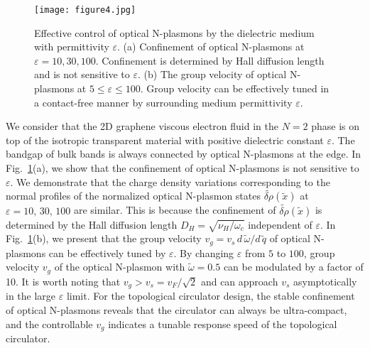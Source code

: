 \documentclass[%
reprint,
amsmath,amssymb,
aps,superscriptaddress
]{revtex4-2}
\begin{document}
\begin{figure}[t]
    \centering
    \texttt{[image: figure4.jpg]}
    \caption{Effective control of optical N-plasmons by the dielectric medium with permittivity $\varepsilon$. (a) Confinement of optical N-plasmons at $\varepsilon=10,30,100$. Confinement is determined by Hall diffusion length and is not sensitive to $\varepsilon$. (b) The group velocity of optical N-plasmons at $5 \leqslant \varepsilon \leqslant 100$. Group velocity can be effectively tuned in a contact-free manner by surrounding medium permittivity $\varepsilon$.}
    \label{fig:fig4}
\end{figure}

We consider that the 2D graphene viscous electron fluid in the $N=2$ phase is on top of the isotropic transparent material with positive dielectric constant $\varepsilon$. The bandgap of bulk bands is always connected by optical N-plasmons at the edge. In Fig.~\ref{fig:fig4}(a), we show that the confinement of optical N-plasmons is not sensitive to $\varepsilon$. We demonstrate that the charge density variations corresponding to the normal profiles of the normalized optical N-plasmon states $\widetilde{\delta \rho}(\tilde{x})$ at $\varepsilon=10,\,30,\,100$ are similar. This is because the confinement of $\widetilde{\delta \rho}(\tilde{x})$ is determined by the Hall diffusion length $D_H=\sqrt{\nu_H/\omega_c}$ independent of $\varepsilon$. In Fig.~\ref{fig:fig4}(b), we present that the group velocity $v_g=v_s\,d\,\tilde{\omega}/d\,\tilde{q}$ of optical N-plasmons can be effectively tuned by $\varepsilon$. By changing $\varepsilon$ from $5$ to $100$, group velocity $v_g$ of the optical N-plasmon with $\tilde{\omega}=0.5$ can be modulated by a factor of 10. It is worth noting that $v_g > v_s=v_F/\sqrt{2}$ and can approach $v_s$ asymptotically in the large $\varepsilon$ limit. For the topological circulator design, the stable confinement of optical N-plasmons reveals that the circulator can always be ultra-compact, and the controllable $v_g$ indicates a tunable response speed of the topological circulator.
\end{document}
